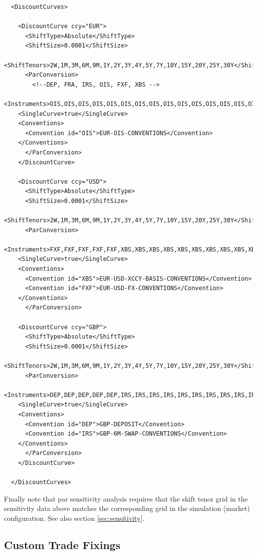 \documentclass[12pt, a4paper]{article}
\begin{document}
\begin{verbatim}
  <DiscountCurves>
  
    <DiscountCurve ccy="EUR">
      <ShiftType>Absolute</ShiftType>
      <ShiftSize>0.0001</ShiftSize>
      <ShiftTenors>2W,1M,3M,6M,9M,1Y,2Y,3Y,4Y,5Y,7Y,10Y,15Y,20Y,25Y,30Y</ShiftTenors>
      <ParConversion>
        <!--DEP, FRA, IRS, OIS, FXF, XBS -->
	<Instruments>OIS,OIS,OIS,OIS,OIS,OIS,OIS,OIS,OIS,OIS,OIS,OIS,OIS,OIS,OIS,OIS</Instruments>
	<SingleCurve>true</SingleCurve>
	<Conventions>
	  <Convention id="OIS">EUR-OIS-CONVENTIONS</Convention>
	</Conventions>
      </ParConversion>
    </DiscountCurve>   
    
    <DiscountCurve ccy="USD">
      <ShiftType>Absolute</ShiftType>
      <ShiftSize>0.0001</ShiftSize>
      <ShiftTenors>2W,1M,3M,6M,9M,1Y,2Y,3Y,4Y,5Y,7Y,10Y,15Y,20Y,25Y,30Y</ShiftTenors>
      <ParConversion>
	<Instruments>FXF,FXF,FXF,FXF,FXF,XBS,XBS,XBS,XBS,XBS,XBS,XBS,XBS,XBS,XBS,XBS</Instruments>
	<SingleCurve>true</SingleCurve>
	<Conventions>
	  <Convention id="XBS">EUR-USD-XCCY-BASIS-CONVENTIONS</Convention>
	  <Convention id="FXF">EUR-USD-FX-CONVENTIONS</Convention>
	</Conventions>
      </ParConversion>

    <DiscountCurve ccy="GBP">
      <ShiftType>Absolute</ShiftType>
      <ShiftSize>0.0001</ShiftSize>
      <ShiftTenors>2W,1M,3M,6M,9M,1Y,2Y,3Y,4Y,5Y,7Y,10Y,15Y,20Y,25Y,30Y</ShiftTenors>
      <ParConversion>
	<Instruments>DEP,DEP,DEP,DEP,DEP,IRS,IRS,IRS,IRS,IRS,IRS,IRS,IRS,IRS,IRS,IRS</Instruments>
	<SingleCurve>true</SingleCurve>
	<Conventions>
	  <Convention id="DEP">GBP-DEPOSIT</Convention>
	  <Convention id="IRS">GBP-6M-SWAP-CONVENTIONS</Convention>
	</Conventions>
      </ParConversion>
    </DiscountCurve>
  
  </DiscountCurves>
\end{verbatim}

Finally note that par sensitivity analysis requires that the shift tenor grid in the sensitivity data above matches the corresponding grid in the simulation (market) configuration. 
See also section \ref{sec:sensitivity}.


\subsection{Custom Trade Fixings}%
\label{example:51}
\end{document}
